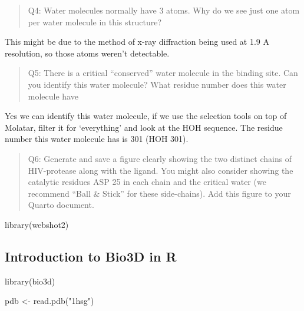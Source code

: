 \documentclass[
  letterpaper,
  DIV=11,
  numbers=noendperiod]{scrartcl}
\newenvironment{Shaded}{\begin{snugshade}}{\end{snugshade}}
\newcommand{\FunctionTok}[1]{\textcolor[rgb]{0.28,0.35,0.67}{#1}}
\newcommand{\NormalTok}[1]{\textcolor[rgb]{0.00,0.23,0.31}{#1}}
\newcommand{\OtherTok}[1]{\textcolor[rgb]{0.00,0.23,0.31}{#1}}
\newcommand{\StringTok}[1]{\textcolor[rgb]{0.13,0.47,0.30}{#1}}
\begin{document}
\begin{quote}
Q4: Water molecules normally have 3 atoms. Why do we see just one atom
per water molecule in this structure?
\end{quote}

This might be due to the method of x-ray diffraction being used at 1.9 A
resolution, so those atoms weren't detectable.

\begin{quote}
Q5: There is a critical ``conserved'' water molecule in the binding
site. Can you identify this water molecule? What residue number does
this water molecule have
\end{quote}

Yes we can identify this water molecule, if we use the selection tools
on top of Molatar, filter it for `everything' and look at the HOH
sequence. The residue number this water molecule has is 301 (HOH 301).

\begin{quote}
Q6: Generate and save a figure clearly showing the two distinct chains
of HIV-protease along with the ligand. You might also consider showing
the catalytic residues ASP 25 in each chain and the critical water (we
recommend ``Ball \& Stick'' for these side-chains). Add this figure to
your Quarto document.
\end{quote}

\begin{Shaded}
\begin{Highlighting}[]
\FunctionTok{library}\NormalTok{(webshot2)}
\end{Highlighting}
\end{Shaded}

\subsection{Introduction to Bio3D in
R}\label{introduction-to-bio3d-in-r}

\begin{Shaded}
\begin{Highlighting}[]
\FunctionTok{library}\NormalTok{(bio3d)}
\end{Highlighting}
\end{Shaded}

\begin{Shaded}
\begin{Highlighting}[]
\NormalTok{pdb }\OtherTok{\textless{}{-}} \FunctionTok{read.pdb}\NormalTok{(}\StringTok{"1hsg"}\NormalTok{)}
\end{Highlighting}
\end{Shaded}
\end{document}

